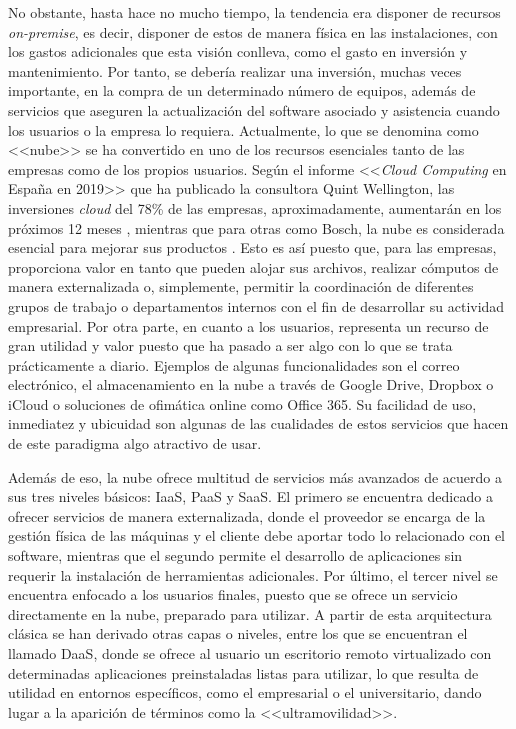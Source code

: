 \clearpage

No obstante, hasta hace no mucho tiempo, la tendencia era disponer de recursos \textit{on-premise}, es decir, disponer de estos de manera física en las instalaciones, con los gastos adicionales que esta visión conlleva, como el gasto en inversión y mantenimiento. Por tanto, se debería realizar una inversión, muchas veces importante, en la compra de un determinado número de equipos, además de servicios que aseguren la actualización del software asociado y asistencia cuando los usuarios o la empresa lo requiera. Actualmente, lo que se denomina como <<nube>> se ha convertido en uno de los recursos esenciales tanto de las empresas como de los propios usuarios. Según el informe <<\textit{Cloud Computing} en España en 2019>> que ha publicado la consultora Quint Wellington, las inversiones \textit{cloud} del 78\% de las empresas, aproximadamente, aumentarán en los próximos 12 meses \cite{datacentermarket2019}, mientras que para otras como Bosch, la nube es considerada esencial para mejorar sus productos \cite{worldenergytrade2019}. Esto es así puesto que, para las empresas, proporciona valor en tanto que pueden alojar sus archivos, realizar cómputos de manera externalizada o, simplemente, permitir la coordinación de diferentes grupos de trabajo o departamentos internos con el fin de desarrollar su actividad empresarial. Por otra parte, en cuanto a los usuarios, representa un recurso de gran utilidad y valor puesto que ha pasado a ser algo con lo que se trata prácticamente a diario. Ejemplos de algunas funcionalidades son el correo electrónico, el almacenamiento en la nube a través de Google Drive, Dropbox o iCloud o soluciones de ofimática online como Office 365. Su facilidad de uso, inmediatez y ubicuidad son algunas de las cualidades de estos servicios que hacen de este paradigma algo atractivo de usar.

Además de eso, la nube ofrece multitud de servicios más avanzados de acuerdo a sus tres niveles básicos: \acf{IaaS}, \acf{PaaS} y \acf{SaaS}. El primero se encuentra dedicado a ofrecer servicios de manera externalizada, donde el proveedor se encarga de la gestión física de las máquinas y el cliente debe aportar todo lo relacionado con el software, mientras que el segundo permite el desarrollo de aplicaciones sin requerir la instalación de herramientas adicionales. Por último, el tercer nivel se encuentra enfocado a los usuarios finales, puesto que se ofrece un servicio directamente en la nube, preparado para utilizar. A partir de esta arquitectura clásica se han derivado otras capas o niveles, entre los que se encuentran el llamado \acf{DaaS}, donde se ofrece al usuario un escritorio remoto virtualizado con determinadas aplicaciones preinstaladas listas para utilizar, lo que resulta de utilidad en entornos específicos, como el empresarial o el universitario, dando lugar a la aparición de términos como la <<ultramovilidad>>.

